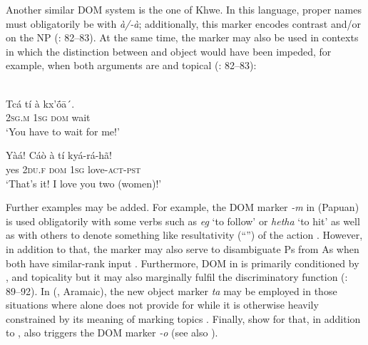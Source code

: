 \documentclass[output=paper]{langsci/langscibook}
\begin{document}
Another similar DOM system is the one of Khwe. In this language, proper names must obligatorily be  with \textit{à/-à}; additionally, this marker encodes contrast and/or  on the NP (\citealt{KilianHatz2006}: 82–83). At the same time, the marker may also be used in contexts in which the distinction between  and object would have been impeded, for example, when both arguments are  and topical (\citealt{KilianHatz2006}: 82–83):

\ea 
{}\\
\ea
\gll  Tcá   tí   à   kx’ṓā´.\\
     \textsc{2sg.m}   \textsc{1sg}   \textsc{dom}  wait\\
\glt ‘You have to wait for me!’

\ex
\gll Yàá!   Cáò   à   tí   kyá-rá-hã!\\
     yes   \textsc{2du.f}   \textsc{dom}  \textsc{1sg}  love-\textsc{act-pst}\\
\glt ‘That’s it! I love you two (women)!’
\z
\z

Further examples may be added. For example, the DOM marker \textit{{}-m} in  (Papuan) is used obligatorily with some verbs such as \textit{eg} ‘to follow’ or \textit{hetha} ‘to hit’ as well as with others to denote something like resultativity (“”) of the action \citep[163]{Seiler1985}. However, in addition to that, the marker may also serve to disambiguate Ps from As when both have similar-rank input \citep[165]{Seiler1985}. Furthermore, DOM in  is primarily conditioned by ,  and topicality but it may also marginally fulfil the discriminatory function (\citealt{Shain2009}: 89–92). In  (, Aramaic), the new object marker \textit{ta} may be employed in those situations where  alone does not provide for  while it is otherwise heavily constrained by its meaning of marking topics \citep[354]{Coghill2014}. Finally, \citet{KurumadaJaeger2015} show for  that, in addition to ,  also triggers the DOM marker \textit{{}-o} (see also \citealt{FedzechkinaEtAl2012}).
\end{document}
